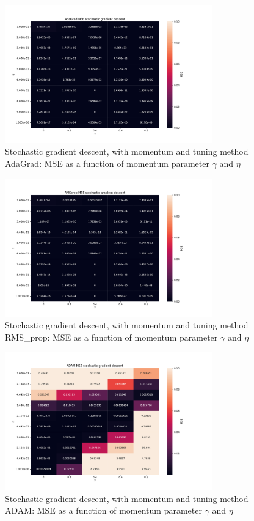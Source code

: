 \begin{figure}[H]
\centering
\includegraphics[width=0.8\textwidth]{Figures/PartA/AdaGrad_sgdm_MSE(eta,momentum)}
\caption{Stochastic gradient descent, with momentum and tuning method AdaGrad: MSE as a function of momentum parameter $\gamma$ and \(\eta \)	 }
\label{fig:AdaGrad_sgdm_MSE-eta-momentum-}
\end{figure}

\begin{figure}[H]
\centering
\includegraphics[width=0.8\textwidth]{Figures/PartA/RMSprop_sgdm_MSE(eta,momentum)}
\caption{Stochastic gradient descent, with momentum and tuning method RMS\_prop: MSE as a function of momentum parameter $\gamma$ and \(\eta \)	 }
\label{fig:RMSprop_sgdm_MSE-eta-momentum-}
\end{figure}

\begin{figure}[H]
\centering
\includegraphics[width=0.8\textwidth]{Figures/PartA/ADAM_sgdm_MSE(eta,momentum)}
\caption{Stochastic gradient descent, with momentum and tuning method ADAM: MSE as a function of momentum parameter $\gamma$ and \(\eta \)	 }
\label{fig:ADAM_sgdm_MSE-eta-momentum-}
\end{figure}


